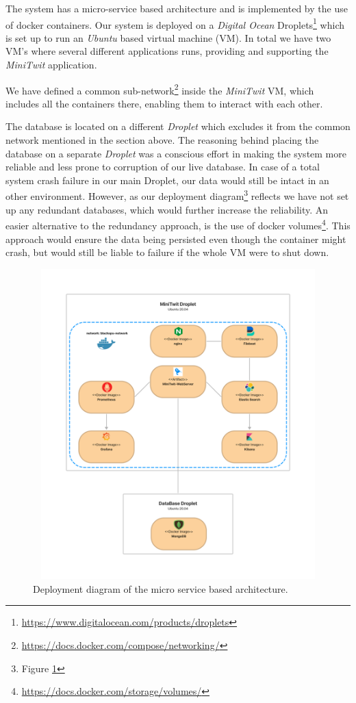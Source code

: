 The system has a micro-service based architecture and is implemented by the use of docker containers. Our system is deployed on a \textit{Digital Ocean} Droplets\footnote{\url{https://www.digitalocean.com/products/droplets}} which is set up to run an \textit{Ubuntu} based virtual machine (VM). In total we have two VM's where several different applications runs, providing and supporting the \textit{MiniTwit} application.

We have defined a common sub-network\footnote{\url{https://docs.docker.com/compose/networking/}} inside the \textit{MiniTwit} VM, which includes all the containers there, enabling them to interact with each other. 

The database is located on a different \textit{Droplet} which excludes it from the common network mentioned in the section above. The reasoning behind placing the database on a separate \textit{Droplet} was a conscious effort in making the system more reliable and less prone to corruption of our live database. In case of a total system crash failure in our main Droplet, our data would still be intact in an other environment. However, as our deployment diagram\footnote{Figure \ref{DeploymentDiagram_1}} reflects we have not set up any redundant databases, which would further increase the reliability. An easier alternative to the redundancy approach, is the use of docker volumes\footnote{\url{https://docs.docker.com/storage/volumes/}}. This approach would ensure the data being persisted even though the container might crash, but would still be liable to failure if the whole VM were to shut down.

\begin{figure}[H]
    \centering
    \includegraphics[width=14cm,height=12cm,keepaspectratio]{images/DevOpsDeploymentDiagram.png}
    \caption{Deployment diagram of the micro service based architecture.}
    \label{DeploymentDiagram_1}
\end{figure}

